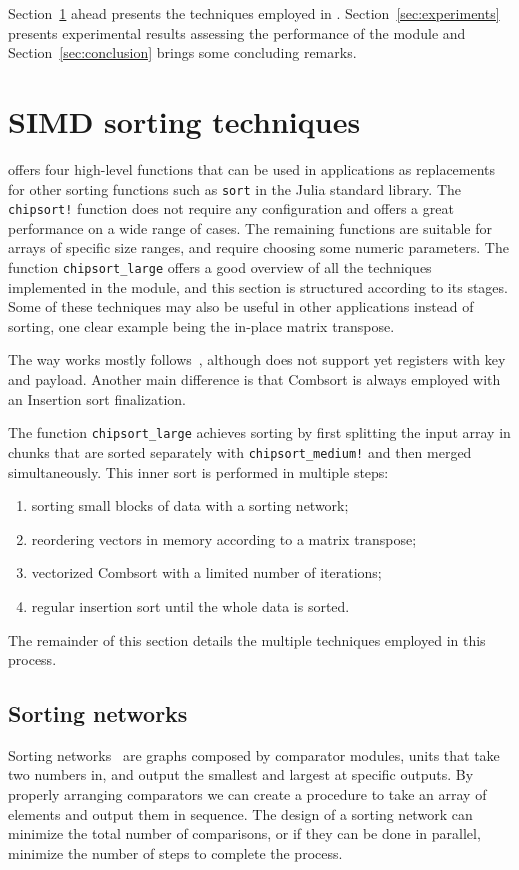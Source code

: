 \documentclass{juliacon}
\begin{document}
Section~\ref{sec:methods} ahead presents the techniques employed in \chipsort. Section~\ref{sec:experiments} presents experimental results assessing the performance of the module and Section~\ref{sec:conclusion} brings some concluding remarks.

\section{SIMD sorting techniques}
\label{sec:methods}
%
\chipsort offers four high-level functions that can be used in applications as replacements for other sorting functions such as {\tt sort} in the Julia standard library. The {\tt chipsort!} function does not require any configuration and offers a great performance on a wide range of cases. The remaining functions are suitable for arrays of specific size ranges, and require choosing some numeric parameters. The function {\tt chipsort\_large} offers a good overview of all the techniques implemented in the module, and this section is structured according to its stages. Some of these techniques may also be useful in other applications instead of sorting, one clear example being the in-place matrix transpose.

The way \chipsort  works mostly follows~\cite{DBLP:journals/pvldb/InoueT15}, although \chipsort does not support yet registers with key and payload. Another main difference is that Combsort is always employed with an Insertion sort finalization.

The function {\tt chipsort\_large} achieves sorting by first splitting the input array in chunks that are sorted separately with {\tt chipsort\_medium!}  and then merged simultaneously. This inner sort is performed in multiple steps:
\begin{enumerate}
\item sorting small blocks of data with a sorting network;
\item reordering vectors in memory according to a matrix transpose;
\item vectorized Combsort with a limited number of iterations;
\item regular insertion sort until the whole data is sorted.
\end{enumerate}

The remainder of this section details the multiple techniques employed in this process.

\subsection{Sorting networks}
%
Sorting networks~\cite[Sec. 5.3.4]{DBLP:books/lib/Knuth98a} are graphs composed by comparator modules, units that take two numbers in, and output the smallest and largest at specific outputs. By properly arranging comparators we can create a procedure to take an array of elements and output them in sequence. The design of a sorting network can minimize the total number of comparisons, or if they can be done in parallel, minimize the number of steps to complete the process.
\end{document}
